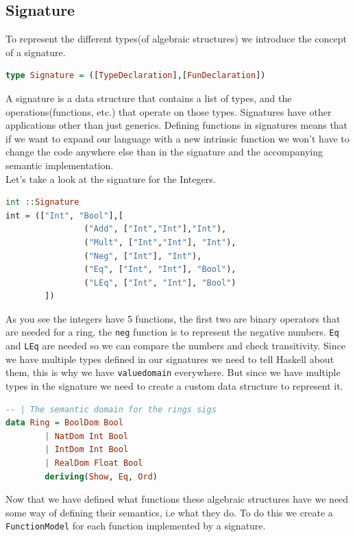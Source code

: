 \documentclass{article}
\begin{document}
        \subsection{Signature}
        To represent the different types(of algebraic structures) we introduce the concept of a signature. 
        \begin{lstlisting}[language=Haskell]
type Signature = ([TypeDeclaration],[FunDeclaration])
        \end{lstlisting}
        A signature is a data structure that contains a list of types, and the operations(functions, etc.) that operate on those types.
        Signatures have other applications other than just generics. Defining functions in signatures means that if we want to expand our language with a new intrinsic function we won't
        have to change the code anywhere else than in the signature and the accompanying semantic implementation.\\
        Let's take a look at the signature for the Integers.
        \begin{lstlisting}[language=Haskell]
int ::Signature
int = (["Int", "Bool"],[
                ("Add", ["Int","Int"],"Int"),
                ("Mult", ["Int","Int"], "Int"),
                ("Neg", ["Int"], "Int"),
                ("Eq", ["Int", "Int"], "Bool"),
                ("LEq", ["Int", "Int"], "Bool")
        ])
        \end{lstlisting}
        As you see the integers have 5 functions, the first two are binary operators that are needed for a ring, the \verb+neg+ function is to represent the negative numbers.
        \verb+Eq+ and \verb+LEq+ are needed so we can compare the numbers and check transitivity.
        Since we have multiple types defined in our signatures we need to tell Haskell about them, this is why we have \verb+valuedomain+ everywhere.
        But since we have multiple types in the signature we need to create a custom data structure to represent it. \\
        \begin{lstlisting}[language=Haskell]
-- | The semantic domain for the rings sigs
data Ring = BoolDom Bool
        | NatDom Int Bool
        | IntDom Int Bool
        | RealDom Float Bool
        deriving(Show, Eq, Ord)
        \end{lstlisting}
        Now that we have defined what functions these algebraic structures have we need some way of defining their semantics, i.e what they do.
        To do this we create a \verb+FunctionModel+ for each function implemented by a signature.
\end{document}
